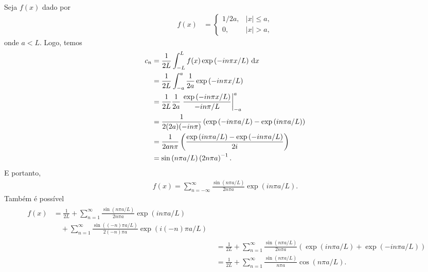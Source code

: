 \begin{exem}
    Seja $f(x)$ dado por
    \begin{align*}
        f(x) &= \begin{cases}
            1 / 2a, & |x| \leq a, \\
            0, & |x| > a,
        \end{cases}
    \end{align*}
    onde $a < L$. Logo, temos
    \begin{align*}
        c_n &= \frac{1}{2L} \int_{-L}^L f(x) \exp\left( -i n \pi x / L \right) \, \mathrm{d}x \\
        &= \frac{1}{2L} \int_{-a}^a \frac{1}{2a} \exp\left( -i n \pi x / L \right) \\
        &= \frac{1}{2L} \frac{1}{2a} \left. \frac{\exp\left( -i n \pi x / L \right)}{- i n \pi / L} \right|_{-a}^a \\
        &= \frac{1}{2 (2a) (-i n \pi)} \left( \exp\left( -i n \pi a / L \right) - \exp\left( i n \pi a / L \right) \right) \\
        &= \frac{1}{2 a n \pi} \left( \frac{\exp\left( i n \pi a / L \right) - \exp\left( -i n \pi a / L \right)}{2 i} \right) \\
        &= \sin\left( n \pi a / L \right) \left( 2 n \pi a \right)^{-1}.
    \end{align*}
    E portanto,
    \begin{align*}
        f(x) = \sum_{n = -\infty}^\infty \frac{\sin\left( n \pi a / L \right)}{2 n \pi a} \exp\left( i n \pi a / L \right).
    \end{align*}
    Tamb\'{e}m \'{e} poss\'{i}vel
    \begin{align*}
        \begin{split}
            f(x) &= \frac{1}{2 L} + \sum_{n = 1}^\infty \frac{\sin\left( n \pi a / L \right)}{2 n \pi a} \exp\left( i n \pi a / L \right) \\
            &\quad {}+ \sum_{n = 1}^\infty \frac{\sin\left( (-n) \pi a / L \right)}{2 (-n) \pi a} \exp\left( i (-n) \pi a / L \right)
        \end{split} \\
        &= \frac{1}{2L} + \sum_{n = 1}^\infty \frac{\sin\left( n \pi a / L \right)}{2 n \pi a} \left( \exp\left( i n \pi a / L \right) + \exp\left( -i n \pi a / L \right) \right) \\
        &= \frac{1}{2L} + \sum_{n = 1}^\infty \frac{\sin\left( n \pi a / L \right)}{n \pi a} \cos\left( n \pi a / L \right).
    \end{align*}
\end{exem}

